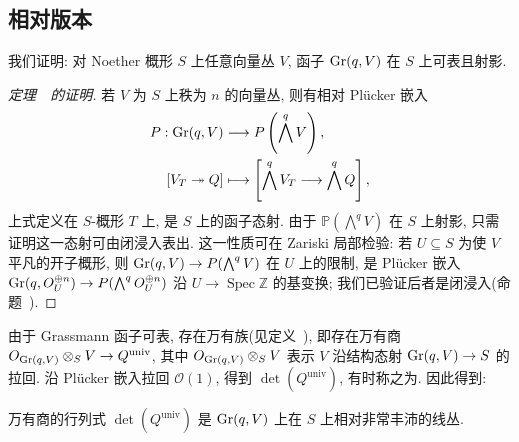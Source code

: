 \subsection{相对版本}\label{src:2.2.3-subsection}
我们证明: 对 Noether 概形 $S$ 上任意向量丛 $V$, 函子 $\operatorname{Gr}(q,V)$ 在 $S$ 上可表且射影.
\begin{proof}[定理~~的证明]
若 $V$ 为 $S$ 上秩为 $n$ 的向量丛, 则有相对 Plücker 嵌入
\[
\begin{aligned}
P:\operatorname{Gr}(q,V)&\longrightarrow P\left(\bigwedge^qV\right),\\
[V_T\twoheadrightarrow Q]&\longmapsto
\left[\bigwedge^qV_T\longrightarrow\bigwedge^qQ\right],
\end{aligned}
\]
上式定义在 $S$-概形 $T$ 上, 是 $S$ 上的函子态射.
由于 $\mathbb P(\bigwedge^qV)$ 在 $S$ 上射影, 只需证明这一态射可由闭浸入表出.
这一性质可在 Zariski 局部检验: 若 $U\subseteq S$ 为使 $V$ 平凡的开子概形, 则 $\operatorname{Gr}(q,V)\to P(\bigwedge^qV)$ 在 $U$ 上的限制, 是 Plücker 嵌入
$\operatorname{Gr}(q,O_U^{\oplus n})\to P(\bigwedge^qO_U^{\oplus n})$
沿 $U\to\operatorname{Spec}\mathbb Z$ 的基变换; 我们已验证后者是闭浸入(命题~).
\end{proof}
由于 Grassmann 函子可表, 存在万有族(见定义~), 即存在万有商
$O_{\operatorname{Gr}(q,V)}\otimes_SV\to Q^{\mathrm{univ}}$, 
其中 $O_{\operatorname{Gr}(q,V)}\otimes_SV$ 表示 $V$ 沿结构态射 $\operatorname{Gr}(q,V)\to S$ 的拉回.
沿 Plücker 嵌入拉回 $\mathcal O(1)$, 得到 $\det(Q^{\mathrm{univ}})$, 有时称之为.
因此得到: 
\begin{corollary}\label{src:2.2.15}
万有商的行列式 $\det(Q^{\mathrm{univ}})$ 是 $\operatorname{Gr}(q,V)$ 上在 $S$ 上相对非常丰沛的线丛.
\end{corollary}
